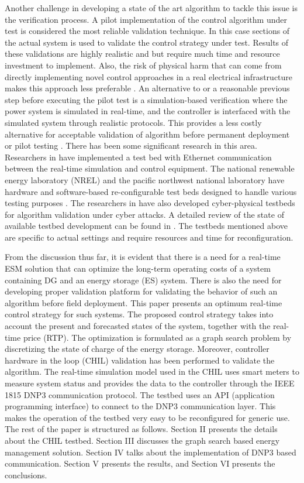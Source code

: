 Another challenge in developing a state of the art algorithm to tackle this issue is the verification process. A pilot implementation of the control algorithm under test is considered the most reliable validation technique. In this case sections of the actual system is used to validate the control strategy under test. Results of these validations are highly realistic and but require much time and resource investment to implement. Also, the risk of physical harm that can come from directly implementing novel control approaches in a real electrical infrastructure makes this approach less preferable \cite{TB_1}. An alternative to or a reasonable previous step before executing the pilot test is a simulation-based verification where the power system is simulated in real-time, and the controller is interfaced with the simulated system through realistic protocols. This provides a less costly alternative for acceptable validation of algorithm before permanent deployment or pilot testing \cite{TB_1}. There has been some significant research in this area. Researchers in \cite{TB_2} have implemented a test bed with Ethernet communication between the real-time simulation and control equipment. The national renewable energy laboratory (NREL) and the pacific northwest national laboratory have hardware and software-based re-configurable test beds designed to handle various testing purposes \cite{NREL_DER_TEST, VOLTRON}. The researchers in \cite{TB_3, TB_5} have also developed cyber-physical testbeds for algorithm validation under cyber attacks. A detailed review of the state of available testbed development can be found in \cite{TB_ALL}. The testbeds mentioned above are specific to actual settings and require resources and time for reconfiguration. 

From the discussion thus far, it is evident that there is a need for a real-time ESM solution that can optimize the long-term operating costs of a system containing DG and an energy storage (ES) system. There is also the need for developing proper validation platform for validating the behavior of such an algorithm before field deployment.  This paper presents an optimum real-time control strategy for such systems. The proposed control strategy takes into account the present and forecasted states of the system, together with the real-time price (RTP). The optimization is formulated as a graph search problem by discretizing the state of charge of the energy storage.
Moreover, controller hardware in the loop (CHIL) validation has been performed to validate the algorithm. The real-time simulation model used in the CHIL uses smart meters to measure system status and provides the data to the controller through the IEEE 1815 DNP3 communication protocol. The testbed uses an API (application programming interface) to connect to the DNP3 communication layer. This makes the operation of the testbed very easy to be reconfigured for generic use. The rest of the paper is structured as follows. Section II  presents the details about the CHIL testbed. Section III discusses the graph search based energy management solution. Section IV talks about the implementation of DNP3 based communication. Section V presents the results, and Section VI presents the conclusions.



